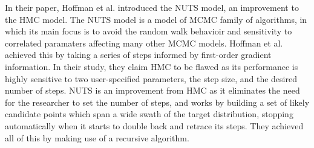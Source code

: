 In their paper, Hoffman et al. introduced the NUTS model, an improvement to the HMC model. The NUTS model is a model of MCMC family of algorithms, in which its main focus is to avoid the random walk behavioir and sensitivity to correlated paramaters affecting many other MCMC models. Hoffman et al. achieved this by taking a series of steps informed by first-order gradient information.\cite{Matthew-D.-Hoffman:2014aa} In their study, they claim HMC to be flawed as its performance is highly sensitive to two user-specified parameters, the step size, and the desired number of steps. NUTS is an improvement from HMC as it eliminates the need for the researcher to set the number of steps, and works by building a set of likely candidate points which span a wide swath of the target distribution, stopping automatically when it starts to double back and retrace its steps. They achieved all of this by making use of a recursive algorithm.
